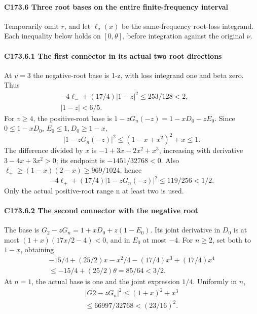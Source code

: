\paragraph{C173.6 Three root bases on the entire finite-frequency interval}

Temporarily omit \(r\), and let \(\ell_\sigma(x)\) be the same-frequency root-loss integrand. Each inequality below holds on \([0,\allowbreak \allowbreak  \theta]\), before integration against the original \(\nu\).

\paragraph{C173.6.1 The first connector in its actual two root directions}

At \(v=3\) the negative-root base is 1-z, with loss integrand one and beta zero. Thus
\[
\begin{gathered}
-4\ell_-+(17/4)|1-z|^2\le253/128<2,\qquad\\
|1-z|<6/5.
\end{gathered}\tag{C173.T183.26}
\]
For \(v\ge4\), the positive-root base is \(1-zG_n(-z)=1-xD_0-zE_0\). Since \(0\le1-xD_0\), \(E_0\le1,\allowbreak \allowbreak  D_0\ge1-x\),
\[
|1-zG_n(-z)|^2\le(1-x+x^2)^2+x\le1.
\]
The difference divided by \(x\) is \(-1+3x-2x^2+x^3\), increasing with derivative \(3-4x+3x^2>0\); its endpoint is \(-1451/32768<0\). Also \(\ell_+\ge(1-x)(2-x)\ge969/1024\), hence
\[
-4\ell_++(17/4)|1-zG_n(-z)|^2\le119/256<1/2.        \tag{C173.T183.27}
\]
Only the actual positive-root range n at least two is used.

\paragraph{C173.6.2 The second connector with the negative root}

The base is \(G_2-zG_n=1+xD_0+z(1-E_0)\). Its joint derivative in \(D_0\) is at most \((1+x)(17x/2-4)<0\), and in \(E_0\) at most \(-4\). For \(n\ge2\), set both to \(1-x\), obtaining
\[
\begin{gathered}
-15/4+(25/2)x-x^2/4-(17/4)x^3+(17/4)x^4\\
\le-15/4+(25/2)\theta=85/64<3/2.
\end{gathered}\tag{C173.T183.28}
\]
At \(n=1\), the actual base is one and the joint expression \(1/4\). Uniformly in \(n\),
\[
\begin{gathered}
|G2-zG_n|^2\le(1+x)^2+x^3\\
\le66997/32768<(23/16)^2.
\end{gathered}\tag{C173.T183.29}
\]

